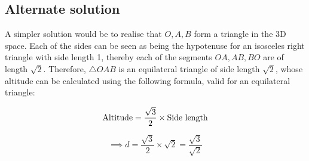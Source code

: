 \subsection*{Alternate solution}

A simpler solution would be to realise that \( O, A, B \) form a triangle in the 3D space.
Each of the sides can be seen as being the hypotenuse for an isosceles right triangle with side length 1, thereby each of the segments \( OA, AB, BO \) are of length \( \sqrt{2} \).
Therefore, \( \triangle OAB \) is an equilateral triangle of side length \( \sqrt{2} \), whose altitude can be calculated using the following formula, valid for an equilateral triangle:

\[
    \text{Altitude} = \frac{\sqrt{3}}{2} \times \text{Side length} \\
\]

\[
    \implies d = \frac{\sqrt{3}}{2} \times \sqrt{2} = \frac{\sqrt{3}}{\sqrt{2}}
\]
